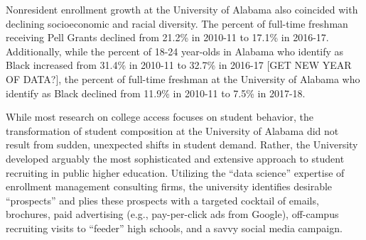 \documentclass[twoside]{article}
\begin{document}
Nonresident enrollment growth at the University of Alabama also coincided with declining socioeconomic and racial diversity.  The percent of full-time freshman receiving Pell Grants declined from 21.2\% in 2010-11 to 17.1\% in 2016-17.  Additionally, while the percent of 18-24 year-olds in Alabama who identify as Black increased from 31.4\% in 2010-11 to 32.7\% in 2016-17 [GET NEW YEAR OF DATA?], the percent of full-time freshman at the University of Alabama who identify as Black declined from 11.9\%  in 2010-11 to 7.5\% in 2017-18.

While most research on college access focuses on student behavior, the transformation of student composition at the University of Alabama did not result from sudden, unexpected shifts in student demand. Rather, the University developed arguably the most sophisticated and extensive approach to student recruiting in public higher education.  Utilizing the ``data science'' expertise of enrollment management consulting firms, the university identifies desirable ``prospects'' and plies these prospects with a targeted cocktail of emails, brochures, paid advertising (e.g., pay-per-click ads from Google), off-campus recruiting visits to ``feeder'' high schools, and a savvy social media campaign. 
\end{document}

